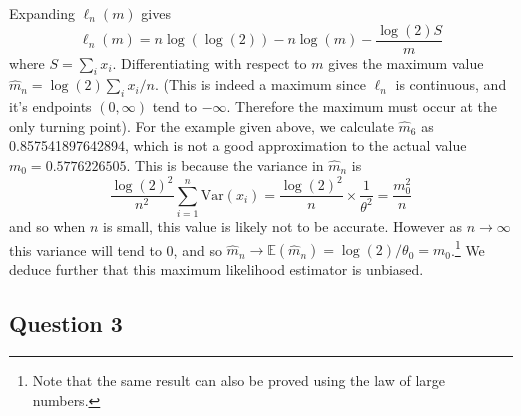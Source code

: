 \documentclass[10pt,a4paper,notitlepage]{article}
\newcommand{\Var}[1]{\mathrm{Var}\left(#1\right)}
\newcommand{\E}[1]{\mathbb{E}\left(#1\right)}
\begin{document}
Expanding $\ell_{n}(m)$ gives
\begin{equation}\label{eq:ELL}
\ell_{n}(m)=n\log\left(\log\left(2\right)\right)-n\log\left(m \right)-\frac{\log\left(2\right)S}{m}
\end{equation}
where $S=\sum_{i}x_{i}$. Differentiating with respect to $m$ gives the maximum value $\widehat{m}_{n}=\log(2)\sum_{i}x_{i}/n$.  (This is indeed a maximum since $\ell_{n}$ is continuous, and it's endpoints $\left(0,\infty\right)$ tend to $-\infty$. Therefore the maximum must occur at the only turning point). For the example given above, we calculate $\widehat{m}_{6}$ as 0.857541897642894, which is not a good approximation to the actual value $m_{0}=0.5776226505$. This is because the variance in $\widehat{m}_{n}$ is 
\begin{equation}
\frac{\log(2)^2}{n^2} \sum_{i=1}^{n}\Var{x_{i}}=\frac{\log(2)^2}{n}\times \frac{1}{\theta^2}=\frac{m_{0}^2}{n}
\end{equation}
and so when $n$ is small, this value is likely not to be accurate. However as $n\rightarrow \infty$ this variance will tend to 0, and so $\widehat{m}_{n}\rightarrow \E{\widehat{m}_{n}}=\log(2)/\theta_{0}=m_{0}$.\footnote{Note that the same result can also be proved using the law of large numbers.} We deduce further that this maximum likelihood estimator is unbiased.

\subsection*{\centering Question 3}
\end{document}

